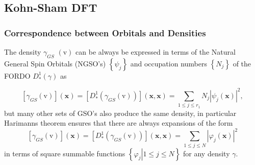 \documentclass[aps,preprint]{revtex4}%
\begin{document}
\subsection{Kohn-Sham DFT}

\subsubsection{Correspondence between Orbitals and Densities}

The density $\gamma_{GS}$ $\left(  \mathrm{v}\right)  $ can be always be
expressed in terms of the Natural General Spin Orbitals (NGSO's) $\left\{
\psi_{j}\right\}  $ and occupation numbers $\left\{  N_{j}\right\}  $ of the
FORDO $D_{\ast}^{1}\left(  \gamma\right)  $ as%

\begin{equation}
\left[  \gamma_{GS}\left(  \mathrm{v}\right)  \right]  \left(  \mathbf{x}%
\right)  =\left[  D_{\ast}^{1}\left(  \gamma_{GS}\left(  \mathrm{v}\right)
\right)  \right]  \left(  \mathbf{x,x}\right)  =\sum_{1\leq j\leq r_{1}}%
N_{j}\left\vert \psi_{j}\left(  \mathbf{x}\right)  \right\vert ^{2},
\label{NGSOexpan}%
\end{equation}
but many other sets of GSO's also produce the same density, in particular
Harimanns \cite{Harimann} theorem ensures that there are always expansions of
the form
\begin{equation}
\left[  \gamma_{GS}\left(  \mathrm{v}\right)  \right]  \left(  \mathbf{x}%
\right)  =\left[  D_{\ast}^{1}\left(  \gamma_{GS}\left(  \mathrm{v}\right)
\right)  \right]  \left(  \mathbf{x,x}\right)  =\sum_{1\leq j\leq N}\left\vert
\varphi_{j}\left(  \mathbf{x}\right)  \right\vert ^{2} \label{Genexp}%
\end{equation}
in terms of square summable functions $\left\{  \left.  \varphi_{j}\right\vert
1\leq j\leq N\right\}  $ for any density $\gamma$.
\end{document}
